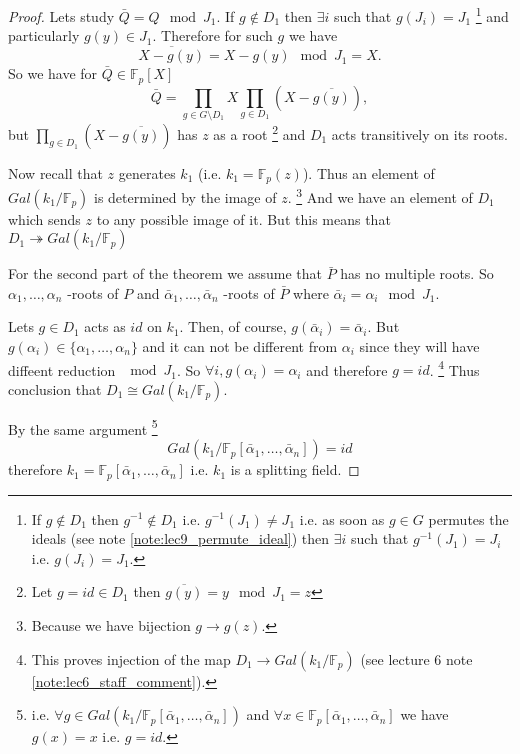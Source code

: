 \begin{theorem}
\begin{proof}
    Lets study $\bar{Q} = Q \mod J_1$. If $g \notin D_1$ then $\exists
    i$ such that $g\left(J_i\right) = J_1$
    \footnote{
      If $g \notin D_1$ then $g^{-1} \notin D_1$ i.e.
      $g^{-1}\left(J_1\right) \ne J_1$ i.e. as soon as $g \in G$
      permutes the ideals (see note \ref{note:lec9_permute_ideal})
      then $\exists i$ such that 
      $g^{-1}\left(J_1\right) = J_i$ i.e. $g\left(J_i\right) = J_1$.
    }
    and particularly $g(y) \in
    J_1$. Therefore for such $g$ we have
    \[
    \overline{X -g\left(y\right)} = X -g\left(y\right) \mod J_1 = X. 
    \]
    So we have for $\bar{Q} \in \mathbb{F}_p\left[X\right]$
    \[
    \bar{Q} = \prod_{g \in G \setminus D_1} X \prod_{g \in D_1}
    \left(X - \overline{g\left(y\right)}\right),
    \]
    but
    \(
    \prod_{g \in D_1}
    \left(X - \overline{g\left(y\right)}\right)
    \) has $z$ as a root
    \footnote{
      Let $g = id \in D_1$ then
      $\overline{g\left(y\right)} = y \mod J_1 = z$        
    }
    and $D_1$ acts transitively on its roots.

    Now recall that $z$ generates $k_1$ (i.e. $k_1 =
    \mathbb{F}_p\left(z\right)$). Thus an element of 
    $Gal\left(k_1/\mathbb{F}_p\right)$ is determined by the image of
    $z$.
    \footnote{
      Because we have bijection $g \to g(z)$. 
    }
    And we have an element of $D_1$ which sends $z$ to any
    possible image of it. But this means that
    \(
    D_1 \twoheadrightarrow
    Gal\left(k_1/\mathbb{F}_p\right)
    \)

    For the second part of the theorem we assume that $\bar{P}$ has no
    multiple roots. So $\alpha_1, \dots, \alpha_n$ -roots of $P$ and
    $\bar{\alpha}_1, \dots, \bar{\alpha}_n$ -roots of $\bar{P}$ where
    $\bar{\alpha}_i = \alpha_i \mod J_1$.

    Lets $g \in D_1$ acts as $id$ on $k_1$. Then, of course,
    $g\left(\bar{\alpha}_i\right) = \bar{\alpha}_i$.
    But $g\left(\alpha_i\right) \in \{\alpha_1, \dots, \alpha_n\}$ and
    it can not be different from $\alpha_i$ since they will have
    diffeent reduction $\mod J_1$. So
    $\forall i,  g\left(\alpha_i\right) = \alpha_i$ and therefore $g =
    id$.
    \footnote{
      This proves injection of the map
      $D_1 \to
      Gal\left(k_1/\mathbb{F}_p\right)$
      (see lecture 6 note \ref{note:lec6_staff_comment}).
    }
    Thus conclusion that $D_1 \cong
    Gal\left(k_1/\mathbb{F}_p\right)$.

    By the same argument
    \footnote{
      i.e.
      $\forall g \in Gal\left(k_1/\mathbb{F}_p\left[\bar{\alpha}_1,
        \dots, \bar{\alpha}_n\right]\right)$ and
      $\forall x \in \mathbb{F}_p\left[\bar{\alpha}_1,
        \dots, \bar{\alpha}_n\right]$ we have $g(x) = x$ i.e.
      $g = id$.
    }
    \[
    Gal\left(k_1/\mathbb{F}_p\left[\bar{\alpha}_1,
      \dots, \bar{\alpha}_n\right]\right) = id
    \]
    therefore
    $k_1 = \mathbb{F}_p\left[\bar{\alpha}_1,
      \dots, \bar{\alpha}_n\right]$ i.e. $k_1$ is a splitting field.
  \end{proof}
\end{theorem}

